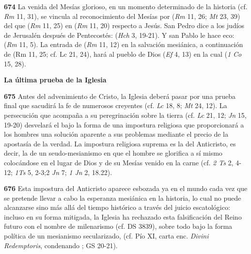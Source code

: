 \textbf{674} La venida del Mesías glorioso, en un momento determinado de la historia (cf. \emph{Rm} 11, 31), se vincula al reconocimiento del Mesías por  (\emph{Rm} 11, 26; \emph{Mt} 23, 39) del que  (\emph{Rm} 11, 25) en  (\emph{Rm} 11, 20) respecto a Jesús. San Pedro dice a los judíos de Jerusalén después de Pentecostés:  (\emph{Hch} 3, 19-21). Y san Pablo le hace eco:  (\emph{Rm} 11, 5). La entrada de  (\emph{Rm} 11, 12) en la salvación mesiánica, a continuación de  (Rm 11, 25; cf. Lc 21, 24), hará al pueblo de Dios  (\emph{Ef} 4, 13) en la cual  (\emph{1 Co} 15, 28).

\textbf{La última prueba de la Iglesia}

\textbf{675} Antes del advenimiento de Cristo, la Iglesia deberá pasar por una prueba final que sacudirá la fe de numerosos creyentes (cf. \emph{Lc} 18, 8; \emph{Mt} 24, 12). La persecución que acompaña a su peregrinación sobre la tierra (cf. \emph{Lc} 21, 12; \emph{Jn} 15, 19-20) desvelará el  bajo la forma de una impostura religiosa que proporcionará a los hombres una solución aparente a sus problemas mediante el precio de la apostasía de la verdad. La impostura religiosa suprema es la del Anticristo, es decir, la de un seudo-mesianismo en que el hombre se glorifica a sí mismo colocándose en el lugar de Dios y de su Mesías venido en la carne (cf. \emph{2 Ts} 2, 4-12; \emph{1Ts} 5, 2-3;2 \emph{Jn} 7; \emph{1 Jn} 2, 18.22).



\textbf{676} Esta impostura del Anticristo aparece esbozada ya en el mundo cada vez que se pretende llevar a cabo la esperanza mesiánica en la historia, lo cual no puede alcanzarse sino más allá del tiempo histórico a través del juicio escatológico: incluso en su forma mitigada, la Iglesia ha rechazado esta falsificación del Reino futuro con el nombre de milenarismo (cf. DS 3839), sobre todo bajo la forma política de un mesianismo secularizado,  (cf. Pío XI, carta enc. \emph{Divini Redemptoris}, condenando ; GS 20-21).

